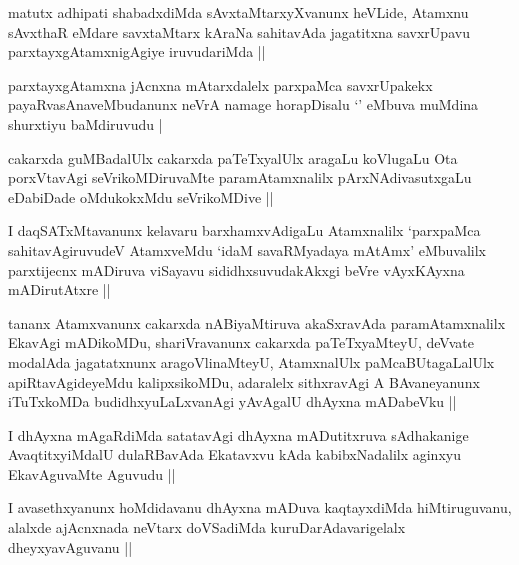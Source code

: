 \begin{artha}
matutx adhipati shabadxdiMda sAvxtaMtarxyXvanunx heVLide, Atamxnu
sAvxthaR eMdare savxtaMtarx kAraNa sahitavAda jagatitxna savxrUpavu
parxtayxgAtamxnigAgiye iruvudariMda ||
\end{artha}


\begin{artha}
parxtayxgAtamxna jAcnxna mAtarxdalelx parxpaMca savxrUpakekx
payaRvasAnaveMbudanunx neVrA namage horapDisalu `\stext' eMbuva
muMdina shurxtiyu baMdiruvudu |
\end{artha}

\begin{artha}
cakarxda guMBadalUlx cakarxda paTeTxyalUlx aragaLu koVlugaLu Ota
porxVtavAgi seVrikoMDiruvaMte paramAtamxnalilx pArxNAdivasutxgaLu
eDabiDade oMdukokxMdu seVrikoMDive ||
\end{artha}


\begin{artha}
I daqSATxMtavanunx kelavaru barxhamxvAdigaLu Atamxnalilx `parxpaMca
sahitavAgiruvudeV AtamxveMdu `idaM savaRMyadaya mAtAmx' eMbuvalilx
parxtijecnx mADiruva viSayavu sididhxsuvudakAkxgi beVre vAyxKAyxna
mADirutAtxre ||
\end{artha}

\begin{artha}
tananx Atamxvanunx cakarxda nABiyaMtiruva akaSxravAda paramAtamxnalilx
EkavAgi mADikoMDu, shariVravanunx cakarxda paTeTxyaMteyU, deVvate
modalAda jagatatxnunx aragoVlinaMteyU, AtamxnalUlx paMcaBUtagaLalUlx
apiRtavAgideyeMdu kalipxsikoMDu, adaralelx sithxravAgi A BAvaneyanunx
iTuTxkoMDa budidhxyuLaLxvanAgi yAvAgalU dhAyxna mADabeVku ||
\end{artha}

\begin{artha}
I dhAyxna mAgaRdiMda satatavAgi dhAyxna mADutitxruva sAdhakanige
AvaqtitxyiMdalU dulaRBavAda Ekatavxvu kAda kabibxNadalilx aginxyu
EkavAguvaMte Aguvudu ||
\end{artha}

\begin{artha}
I avasethxyanunx hoMdidavanu dhAyxna mADuva kaqtayxdiMda
hiMtiruguvanu, alalxde ajAcnxnada neVtarx doVSadiMda
kuruDarAdavarigelalx dheyxyavAguvanu ||
\end{artha}

